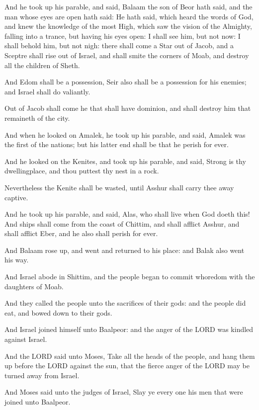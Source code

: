 \Verse And he took up his parable, and said, Balaam the son of Beor
hath said, and the man whose eyes are open hath said: \Verse He hath
said, which heard the words of God, and knew the knowledge of the most
High, which saw the vision of the Almighty, falling into a trance, but
having his eyes open: \Verse I shall see him, but not now: I shall
behold him, but not nigh: there shall come a Star out of Jacob, and a
Sceptre shall rise out of Israel, and shall smite the corners of Moab,
and destroy all the children of Sheth.

\Verse And Edom shall be a possession, Seir also shall be a possession
for his enemies; and Israel shall do valiantly.

\Verse Out of Jacob shall come he that shall have dominion, and shall
destroy him that remaineth of the city.

\Verse And when he looked on Amalek, he took up his parable, and said,
Amalek was the first of the nations; but his latter end shall be that
he perish for ever.

\Verse And he looked on the Kenites, and took up his parable, and said,
Strong is thy dwellingplace, and thou puttest thy nest in a rock.

\Verse Nevertheless the Kenite shall be wasted, until Asshur shall
carry thee away captive.

\Verse And he took up his parable, and said, Alas, who shall live when
God doeth this!  \Verse And ships shall come from the coast of Chittim,
and shall afflict Asshur, and shall afflict Eber, and he also shall
perish for ever.

\Verse And Balaam rose up, and went and returned to his place: and
Balak also went his way.


\Chapter
\Verse And Israel abode in Shittim, and the people began to commit
whoredom with the daughters of Moab.

\Verse And they called the people unto the sacrifices of their gods: and
the people did eat, and bowed down to their gods.

\Verse And Israel joined himself unto Baalpeor: and the anger of the
LORD was kindled against Israel.

\Verse And the LORD said unto Moses, Take all the heads of the people,
and hang them up before the LORD against the sun, that the fierce
anger of the LORD may be turned away from Israel.

\Verse And Moses said unto the judges of Israel, Slay ye every one his
men that were joined unto Baalpeor.


